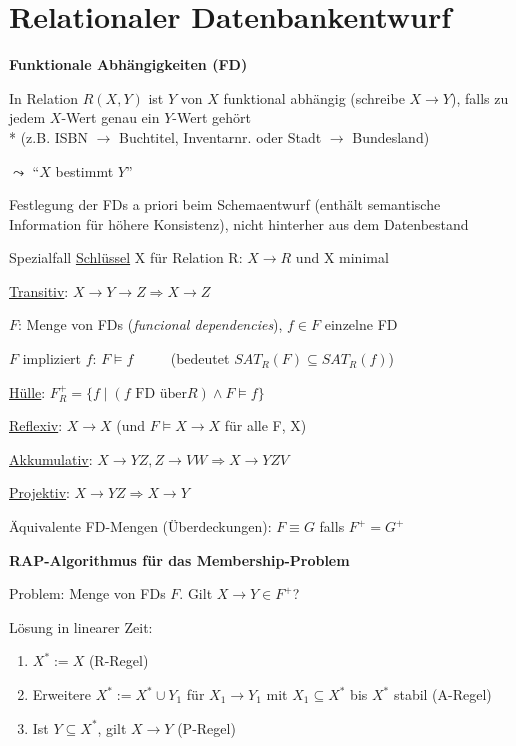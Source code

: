 \section{Relationaler Datenbankentwurf}
\label{sec:abbildenRelational}

\textbf{Funktionale Abhängigkeiten (FD)}
\begin{items}
	\item In Relation \( R(X,Y) \) ist \( Y \) von \( X \) funktional abhängig (schreibe \( X \to Y \)), falls zu jedem \( X \)-Wert genau ein \( Y \)-Wert gehört \\*
	 (z.B. ISBN $\to$ Buchtitel, Inventarnr. oder Stadt $\to$ Bundesland)
	\item \( \leadsto \) ``\( X \) bestimmt \( Y \)''
	\item Festlegung der FDs a priori beim Schemaentwurf (enthält semantische Information für höhere Konsistenz), nicht hinterher aus dem Datenbestand
	\item Spezialfall \underline{Schlüssel} X für Relation R: $X \to R$ und X minimal
	\item \underline{Transitiv}: $X \to  Y  \to  Z \Rightarrow  X  \to Z$
	\item \( F \): Menge von FDs (\emph{funcional dependencies}), \( f \in F \) einzelne FD
	\item \( F \) impliziert \( f \): \( F \models f \)   $\qquad$  (bedeutet $SAT_R(F) \subseteq SAT_R(f)$)
	\item \underline{Hülle}: \( F_R^+ = \{ f \mid (f \text{ FD über} R) \wedge F \models f \} \)
	\item \underline{Reflexiv}: $X \to X$ (und $F \models X \to X$ für alle F, X)
	\item \underline{Akkumulativ}: $X \to YZ, Z \to VW \Rightarrow X \to YZV$
	\item \underline{Projektiv}: $X \to YZ \Rightarrow X \to Y$
	\item Äquivalente FD-Mengen (Überdeckungen): \( F \equiv G \) falls \( F^+ = G^+ \)
\end{items}

\textbf{RAP-Algorithmus für das Membership-Problem}
\begin{items}
	\item  Problem: Menge von FDs $F$. Gilt $X \to Y \in F^+$?
	\item Lösung in linearer Zeit:
	\begin{enumerate}
		\item $X^* :=  X$ (R-Regel)
		\item Erweitere $X^* := X^* \cup Y_1$ für $X_1 \to Y_1$ mit $X_1 \subseteq X^*$ bis $X^*$ stabil (A-Regel)
		\item Ist $Y \subseteq X^*$, gilt $X \to Y$ (P-Regel)
	\end{enumerate}
\end{items}

